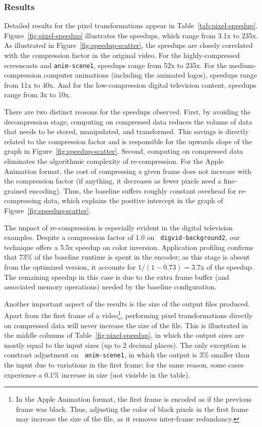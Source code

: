 \subsubsection{Results}

Detailed results for the pixel transformations appear in
Table~\ref{tab:pixel-speedup}.  Figure~\ref{fig:pixel-speedup}
illustrates the speedups, which range from 3.1x to 235x.  As
illustrated in Figure~\ref{fig:speedup-scatter}, the speedups
are closely correlated with the compression factor in the original
video.  For the highly-compressed screencasts and {\tt anim-scene1},
speedups range from 52x to 235x.  For the medium-compression computer
animations (including the animated logos), speedups range from 11x to
40x.  And for the low-compression digital television content, speedups
range from 3x to 10x.

There are two distinct reasons for the speedups observed.  First, by
avoiding the decompression stage, computing on compressed data reduces
the volume of data that needs to be stored, manipulated, and
transformed.  This savings is directly related to the compression
factor and is responsible for the upwards slope of the graph in
Figure~\ref{fig:speedup-scatter}.  Second, computing on
compressed data eliminates the algorithmic complexity of
re-compression.  For the Apple Animation format, the cost of
compressing a given frame does not increase with the compression
factor (if anything, it decreases as fewer pixels need a fine-grained
encoding).  Thus, the baseline suffers roughly constant overhead for
re-compressing data, which explains the positive intercept in the
graph of Figure~\ref{fig:speedup-scatter}.

The impact of re-compression is especially evident in the digital
television examples.  Despite a compression factor of 1.0 on {\tt
digvid-background2}, our technique offers a 5.5x speedup on color
inversion.  Application profiling confirms that 73\% of the baseline
runtime is spent in the encoder; as this stage is absent from the
optimized version, it accounts for $1/(1-0.73) = 3.7$x of the speedup.
The remaining speedup in this case is due to the extra frame buffer
(and associated memory operations) needed by the baseline
configuration.

Another important aspect of the results is the size of the output
files produced.  Apart from the first frame of a video\footnote{In the
Apple Animation format, the first frame is encoded as if the previous
frame was black.  Thus, adjusting the color of black pixels in the
first frame may increase the size of the file, as it removes
inter-frame redundancy.}, performing pixel transformations directly on
compressed data will never increase the size of the file.  This is
illustrated in the middle columns of Table~\ref{fig:pixel-speedup}, in
which the output sizes are mostly equal to the input sizes (up to 2
decimal places).  The only exception is constrast adjustment on {\tt
anim-scene1}, in which the output is 3\% smaller than the input due to
variations in the first frame; for the same reason, some cases
experience a 0.1\% increase in size (not visisble in the table).

